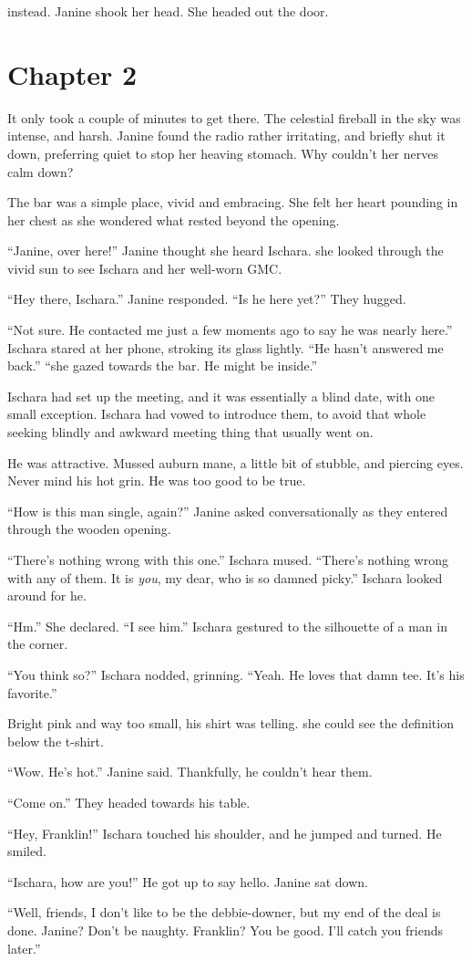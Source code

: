 instead. Janine shook her head. She headed out the door. \par \par \chapter{Chapter 2} \par  It only took a couple of minutes to get there. The celestial fireball in the sky was intense, and harsh. Janine found the radio rather irritating, and briefly shut it down, preferring quiet to stop her heaving stomach. Why couldn't her nerves calm down? \par The bar was a simple place, vivid and embracing. She felt her heart pounding in her chest as she wondered what rested beyond the opening. \par ``Janine, over here!'' Janine thought she heard Ischara. she looked through the vivid sun to see Ischara and her well-worn GMC. \par ``Hey there, Ischara.'' Janine responded. ``Is he here yet?'' They hugged. \par ``Not sure. He contacted me just a few moments ago to say he was nearly here.'' Ischara stared at her phone, stroking its glass lightly. ``He hasn't answered me back.'' ``she gazed towards the bar. He might be inside.'' \par Ischara had set up the meeting, and it was essentially a blind date, with one small exception. Ischara had vowed to introduce them, to avoid that whole seeking blindly and awkward meeting thing that usually went on. \par He was attractive. Mussed auburn mane, a little bit of stubble, and piercing eyes. Never mind his hot grin. He was too good to be true. \par ``How is this man single, again?'' Janine asked conversationally as they entered through the wooden opening. \par ``There's nothing wrong with this one.'' Ischara mused. ``There's nothing wrong with any of them. It is \textit{you}, my dear, who is so damned picky.'' Ischara looked around for he. \par ``Hm.'' She declared. ``I see him.'' Ischara gestured to the silhouette of a man in the corner. \par ``You think so?'' Ischara nodded, grinning. ``Yeah. He loves that damn tee. It's his favorite.'' \par Bright pink and way too small, his shirt was telling. she could see the definition below the t-shirt. \par ``Wow. He's hot.'' Janine said. Thankfully, he couldn't hear them. \par ``Come on.'' They headed towards his table. \par ``Hey, Franklin!'' Ischara touched his shoulder, and he jumped and turned. He smiled. \par ``Ischara, how are you!'' He got up to say hello. Janine sat down. \par ``Well, friends, I don't like to be the debbie-downer, but my end of the deal is done. Janine? Don't be naughty. Franklin? You be good. I'll catch you friends later.'' \par 